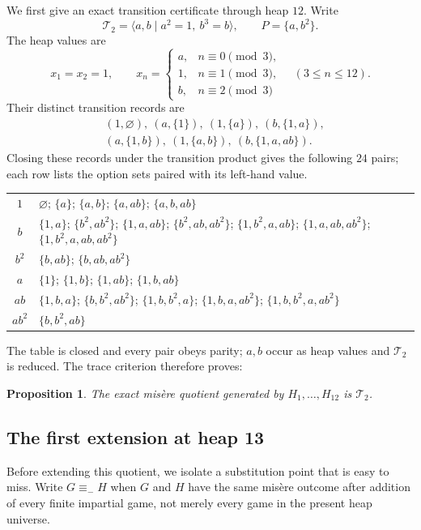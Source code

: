 \documentclass[11pt]{article}
\newtheorem{proposition}[theorem]{Proposition}
\theoremstyle{definition}
\theoremstyle{remark}
\begin{document}
We first give an exact transition certificate through heap $12$.  Write
\[
 \mathcal T_2=\langle a,b\mid a^2=1,\ b^3=b\rangle,
 \qquad P=\{a,b^2\}.
\]
The heap values are
\[
 x_1=x_2=1,\qquad
 x_n=
 \begin{cases}
 a,&n\equiv0\pmod3,\\
 1,&n\equiv1\pmod3,\\
 b,&n\equiv2\pmod3
 \end{cases}
 \quad(3\le n\le12).
\]
Their distinct transition records are
\begin{align*}
 &(1,\varnothing),\ (a,\{1\}),\ (1,\{a\}),\
 (b,\{1,a\}),\\
 &(a,\{1,b\}),\ (1,\{a,b\}),\
 (b,\{1,a,ab\}).
\end{align*}
Closing these records under the transition product gives the following
$24$ pairs; each row lists the option sets paired with its left-hand value.
\begin{center}
\small
\begin{tabular}{c@{\quad}l}
\toprule
$1$ & $\varnothing$; $\{a\}$; $\{a,b\}$; $\{a,ab\}$;
       $\{a,b,ab\}$\\
$b$ & $\{1,a\}$; $\{b^2,ab^2\}$; $\{1,a,ab\}$;
       $\{b^2,ab,ab^2\}$; $\{1,b^2,a,ab\}$;
       $\{1,a,ab,ab^2\}$; $\{1,b^2,a,ab,ab^2\}$\\
$b^2$ & $\{b,ab\}$; $\{b,ab,ab^2\}$\\
$a$ & $\{1\}$; $\{1,b\}$; $\{1,ab\}$; $\{1,b,ab\}$\\
$ab$ & $\{1,b,a\}$; $\{b,b^2,ab^2\}$;
       $\{1,b,b^2,a\}$; $\{1,b,a,ab^2\}$;
       $\{1,b,b^2,a,ab^2\}$\\
$ab^2$ & $\{b,b^2,ab\}$\\
\bottomrule
\end{tabular}
\end{center}
The table is closed and every pair obeys parity; $a,b$ occur as heap values
and $\mathcal T_2$ is reduced.  The trace criterion therefore proves:

\begin{proposition}\label{prop:grundy12}
The exact mis\`ere quotient generated by $H_1,\ldots,H_{12}$ is
$\mathcal T_2$.
\end{proposition}

\subsection{The first extension at heap 13}

Before extending this quotient, we isolate a substitution point that is
easy to miss.  Write $G\equiv_-H$ when $G$ and $H$ have the same mis\`ere
outcome after addition of every finite impartial game, not merely every
game in the present heap universe.
\end{document}
